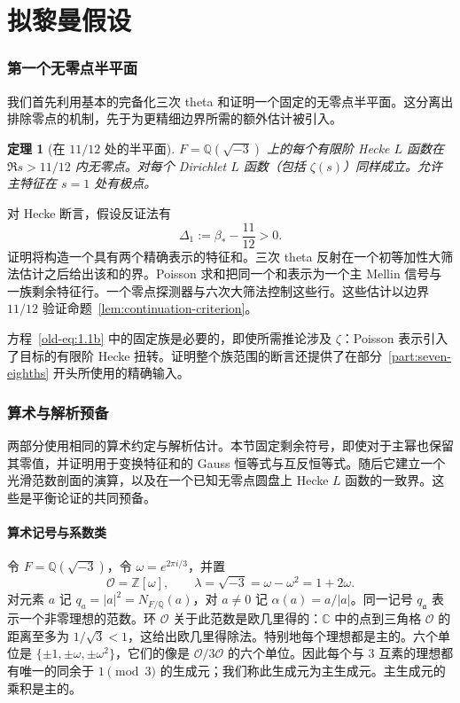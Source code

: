 \documentclass[11pt,a4paper]{article}
\numberwithin{equation}{section}
\numberwithin{figure}{section}
\newtheorem{theorem}{定理}[section]
\theoremstyle{definition}
\theoremstyle{remark}
\begin{document}
\clearpage
\part{拟黎曼假设}
\label{part:eleven-twelfths}

\section{第一个无零点半平面}
\label{sec:first-stage}

我们首先利用基本的完备化三次 theta 和证明一个固定的无零点半平面。这分离出排除零点的机制，先于为更精细边界所需的额外估计被引入。

\begin{theorem}[在 $11/12$ 处的半平面]
\label{thm:eleven-twelfths}
$F=\mathbb Q(\sqrt{-3})$ 上的每个有限阶 Hecke $L$ 函数在 $\Re s>11/12$ 内无零点。对每个 Dirichlet $L$ 函数（包括 $\zeta(s)$）同样成立。允许主特征在 $s=1$ 处有极点。
\end{theorem}

对 Hecke 断言，假设反证法有
\begin{equation}
 \Delta_1:=\beta_*-\frac{11}{12}>0.
 \label{eq:first-stage-gap}
\end{equation}
证明将构造一个具有两个精确表示的特征和。三次 theta 反射在一个初等加性大筛法估计之后给出该和的界。Poisson 求和把同一个和表示为一个主 Mellin 信号与一族剩余特征行。一个零点探测器与六次大筛法控制这些行。这些估计以边界 $11/12$ 验证命题~\ref{lem:continuation-criterion}。

方程~\eqref{old-eq:1.1b} 中的固定族是必要的，即使所需推论涉及 $\zeta$：Poisson 表示引入了目标的有限阶 Hecke 扭转。证明整个族范围的断言还提供了在部分~\ref{part:seven-eighths} 开头所使用的精确输入。

\section{算术与解析预备}\label{sec:arithmetic}

两部分使用相同的算术约定与解析估计。本节固定剩余符号，即使对于主幂也保留其零值，并证明用于变换特征和的 Gauss 恒等式与互反恒等式。随后它建立一个光滑范数剖面的演算，以及在一个已知无零点圆盘上 Hecke $L$ 函数的一致界。这些是平衡论证的共同预备。

\subsection{算术记号与系数类}

令 $F=\mathbb Q(\sqrt{-3})$，令
$\omega=e^{2\pi i/3}$，并置
\[
 \mathcal O=\mathbb Z[\omega],\qquad
 \lambda=\sqrt{-3}=\omega-\omega^2=1+2\omega.
\]
对元素 $a$ 记 $q_a=|a|^2=N_{F/\mathbb Q}(a)$，对 $a\ne0$ 记 $\alpha(a)=a/|a|$。同一记号 $q_{\mathfrak a}$ 表示一个非零理想的范数。环 $\mathcal O$ 关于此范数是欧几里得的：$\mathbb C$ 中的点到三角格 $\mathcal O$ 的距离至多为 $1/\sqrt3<1$，这给出欧几里得除法。特别地每个理想都是主的。六个单位是 $\{\pm1,\pm\omega,\pm\omega^2\}$，它们的像是 $\mathcal O/3\mathcal O$ 的六个单位。因此每个与 $3$ 互素的理想都有唯一的同余于 $1\pmod3$ 的生成元；我们称此生成元为主生成元。主生成元的乘积是主的。
\end{document}
